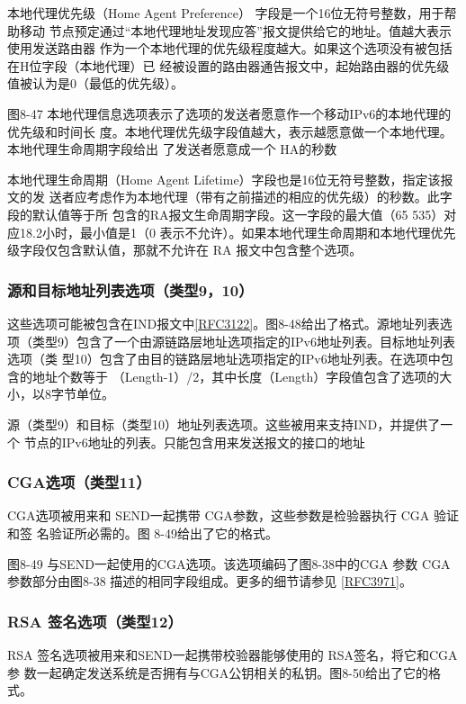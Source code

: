本地代理优先级（Home Agent Preference） 字段是一个16位无符号整数，用于帮助移动
节点预定通过“本地代理地址发现应答”报文提供给它的地址。值越大表示使用发送路由器
作为一个本地代理的优先级程度越大。如果这个选项没有被包括在H位字段（本地代理）已
经被设置的路由器通告报文中，起始路由器的优先级值被认为是0（最低的优先级）。

图8-47 本地代理信息选项表示了选项的发送者愿意作一个移动IPv6的本地代理的优先级和时间长
度。本地代理优先级字段值越大，表示越愿意做一个本地代理。本地代理生命周期字段给出
了发送者愿意成一个 HA的秒数

本地代理生命周期（Home Agent Lifetime）字段也是16位无符号整数，指定该报文的发
送者应考虑作为本地代理（带有之前描述的相应的优先级）的秒数。此字段的默认值等于所
包含的RA报文生命周期字段。这一字段的最大值（65 535）对应18.2小时，最小值是1（0
表示不允许）。如果本地代理生命周期和本地代理优先级字段仅包含默认值，那就不允许在
RA 报文中包含整个选项。

\subsubsection{源和目标地址列表选项（类型9，10）}
这些选项可能被包含在IND报文中\href{https://www.rfc-editor.org/rfc/rfc3122}{[RFC3122]}。图8-48给出了格式。源地址列表选
项（类型9）包含了一个由源链路层地址选项指定的IPv6地址列表。目标地址列表选项（类
型10）包含了由目的链路层地址选项指定的IPv6地址列表。在选项中包含的地址个数等于
（Length-1）/2，其中长度（Length）字段值包含了选项的大小，以8字节单位。

源（类型9）和目标（类型10）地址列表选项。这些被用来支持IND，并提供了一个
节点的IPv6地址的列表。只能包含用来发送报文的接口的地址

\subsubsection{CGA选项（类型11）}
CGA选项被用来和 SEND一起携带 CGA参数，这些参数是检验器执行 CGA 验证和签
名验证所必需的。图 8-49给出了它的格式。

图8-49 与SEND一起使用的CGA选项。该选项编码了图8-38中的CGA 参数
CGA 参数部分由图8-38 描述的相同字段组成。更多的细节请参见
\href{https://www.rfc-editor.org/rfc/rfc3971}{[RFC3971]}。

\subsubsection{RSA 签名选项（类型12）}
RSA 签名选项被用来和SEND一起携带校验器能够使用的 RSA签名，将它和CGA参
数一起确定发送系统是否拥有与CGA公钥相关的私钥。图8-50给出了它的格式。

